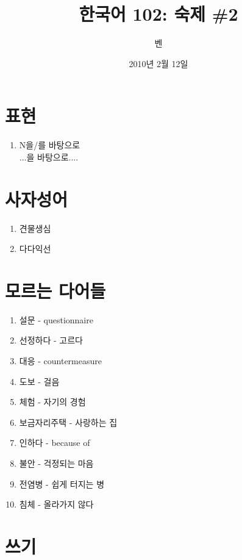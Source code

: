 \documentclass{article}
\title{한국어 102: 숙제 \#2}
\author{벤}
\date{2010년 2월 12일}
\begin{document}
\maketitle
\thispagestyle{empty}
\pagestyle{empty}

\section{표현}
\begin{enumerate}
  \item N을/를 바탕으로 \\
 ...을 바탕으로....
\end{enumerate}

\section{사자성어}
\begin{enumerate}
  \item 견물생심
  \item 다다익선
\end{enumerate}

\section{모르는 다어들}
\begin{enumerate}
  \item 설문 - questionnaire
  \item 선정하다 - 고르다
  \item 대응 - countermeasure
  \item 도보 - 걸음
  \item 체험 - 자기의 경험
  \item 보금자리주택 - 사랑하는 집
  \item 인하다 - because of
  \item 불안 - 걱정되는 마음
  \item 전염병 - 쉽게 터지는 병
  \item 침체 - 올라가지 않다
\end{enumerate}

\section{쓰기}
\end{document}
